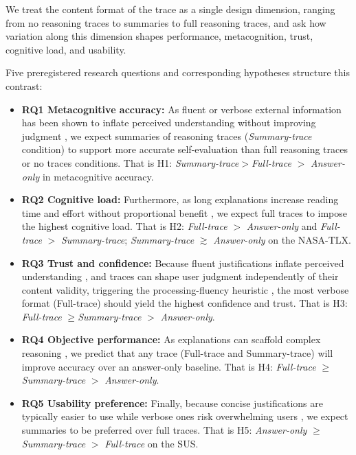\documentclass[acmlarge,review=true, anonymous=true]{acmart}
\begin{document}

We treat the content format of the trace as a single design dimension, ranging from no reasoning traces to summaries to full reasoning traces, and ask how variation along this dimension shapes performance, metacognition, trust, cognitive load, and usability. 

Five preregistered research questions and corresponding hypotheses structure this contrast:

\begin{itemize}
    \item \textbf{RQ1 Metacognitive accuracy:} As fluent or verbose external information has been shown to inflate perceived understanding without improving judgment \cite{fisher2021harder, johnson_source_1993}, we expect summaries of reasoning traces (\textit{Summary-trace} condition) to support more accurate self-evaluation than full reasoning traces or no traces conditions. That is H1: \textit{Summary-trace}$>$\textit{Full-trace} $>$ \textit{Answer-only} in metacognitive accuracy. 
    \item \textbf{RQ2 Cognitive load:} Furthermore, as long explanations increase reading time and effort without proportional benefit \cite{vasconcelos2023explanations, bertrand2022cognitive}, we expect full traces to impose the highest cognitive load. That is H2: \textit{Full-trace} $>$ \textit{Answer-only} and \textit{Full-trace} $>$ \textit{Summary-trace}; \textit{Summary-trace} $\gtrsim$ \textit{Answer-only} on the NASA-TLX. 
    \item \textbf{RQ3 Trust and confidence:} Because fluent justifications inflate perceived understanding \cite{fisher2021harder}, and traces can shape user judgment independently of their content validity, triggering the processing-fluency heuristic \cite{alter_overcoming_2007}, the most verbose format (Full-trace) should yield the highest confidence and trust. That is H3: \textit{Full-trace} $\geq $\textit{Summary-trace} $>$ \textit{Answer-only}.
    \item \textbf{RQ4 Objective performance:} As explanations can scaffold complex reasoning \cite{10.1145/3411764.3445717,tankelevitch2023metacognitive}, we predict that any trace (Full-trace and Summary-trace) will improve accuracy over an answer-only baseline. That is H4: \textit{Full-trace} $\geq$ \textit{Summary-trace} $>$ \textit{Answer-only}.
    \item \textbf{RQ5 Usability preference:} Finally, because concise justifications are typically easier to use while verbose ones risk overwhelming users \cite{}, we expect summaries to be preferred over full traces. That is H5: \textit{Answer-only} $\geq$ \textit{Summary-trace} $>$ \textit{Full-trace} on the SUS.
\end{itemize} 
\end{document}
